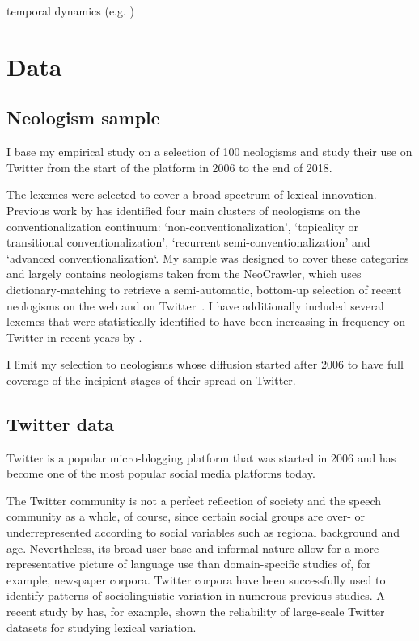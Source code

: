 \documentclass[
  a4paper,
  abstract=on,
  captions=tableabove
  ]{scrartcl}
\begin{document}
    temporal dynamics (e.g. )


\section{Data}
  \label{sec:data}
  \subsection{Neologism sample}
    \label{subsec:neo-sample}

  I base my empirical study on a selection of 100 neologisms and study their use on Twitter from the start of the platform in 2006 to the end of 2018.

  The lexemes were selected to cover a broad spectrum of lexical innovation. Previous work by \textcite[115--147]{Kerremans2015WebNew} has identified four main clusters of neologisms on the conventionalization continuum: `non-conventionalization', `topicality or transitional conventionalization', `recurrent semi-conventionalization' and `advanced conventionalization`. My sample was designed to cover these categories and largely contains neologisms taken from the NeoCrawler, which uses dictionary-matching to retrieve a semi-automatic, bottom-up selection of recent neologisms on the web and on Twitter~\parencite{Kerremans2019UsingDatamining}. I have additionally included several lexemes that were statistically identified to have been increasing in frequency on Twitter in recent years by \textcite{Grieve2016AnalyzingLexical}.

  I limit my selection to neologisms whose diffusion started after 2006 to have full coverage of the incipient stages of their spread on Twitter.

  \subsection{Twitter data}
    \label{subsec:twitter-data}

    Twitter is a popular micro-blogging platform that was started in 2006 and has become one of the most popular social media platforms today.

    The Twitter community is not a perfect reflection of society and the speech community as a whole, of course, since certain social groups are over- or underrepresented according to social variables such as regional background and age. Nevertheless, its broad user base and informal nature allow for a more representative picture of language use than domain-specific studies of, for example, newspaper corpora. Twitter corpora have been successfully used to identify patterns of sociolinguistic variation in numerous previous studies. A recent study by \textcite{Grieve2019MappingLexical} has, for example, shown the reliability of large-scale Twitter datasets for studying lexical variation.
\end{document}
